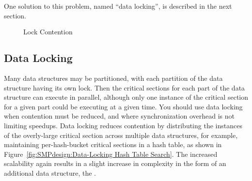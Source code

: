One solution to this problem, named ``data locking'', is described
in the next section.

\begin{figure}[htb]
\begin{center}
\end{center}
\caption{Lock Contention}
\end{figure}

\subsection{Data Locking}
\label{sec:SMPdesign:Data Locking}

Many data structures may be partitioned,
with each partition of the data structure having its own lock.
Then the critical sections for each part of the data structure
can execute in parallel,
although only one instance of the critical section for a given
part could be executing at a given time.
You should use data locking when contention must
be reduced, and where synchronization overhead is not
limiting speedups.
Data locking reduces contention by distributing the instances
of the overly-large critical section across multiple data structures,
for example, maintaining per-hash-bucket critical sections in a
hash table, as shown in
Figure~\ref{fig:SMPdesign:Data-Locking Hash Table Search}.
The increased scalability again results in a slight increase in complexity
in the form of an additional data structure, the .

